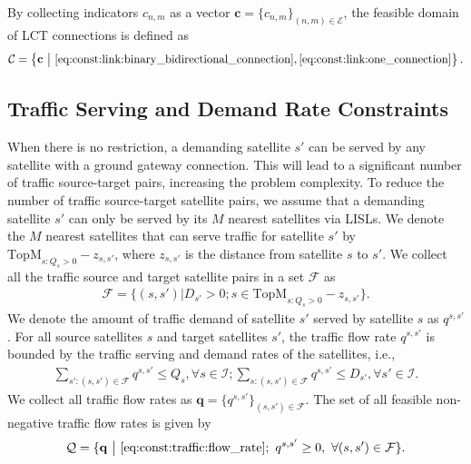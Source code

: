 \documentclass[journal]{IEEEtran}
\begin{document}
By collecting indicators $c_{n,m}$ as a vector  $\mathbf{c} = \{c_{n,m}\}_{(n,m)\in\mathcal{E}}$, the feasible domain of LCT connections is defined as
\begin{equation}
  \begin{aligned}
    \mathcal{C} = \left\{ \mathbf{c} \ \big|\   \eqref{eq:const:link:binary_bidirectional_connection},\eqref{eq:const:link:one_connection}\right\}.
  \end{aligned}
\end{equation}


\subsection{Traffic Serving and Demand Rate Constraints}
When there is no restriction, a demanding satellite $s'$ can be served by any satellite with a ground gateway connection. This will lead to a significant number of traffic source-target pairs, increasing the problem complexity.
To reduce the number of traffic source-target satellite pairs, we assume that a demanding satellite $s'$ can only be served by its $M$ nearest satellites via LISLs.
We denote the $M$ nearest satellites that can serve traffic for satellite $s'$ by $\mathrm{TopM}_{s:Q_s > 0} -z_{s,s'}$, where $z_{s,s'}$ is the distance from satellite $s$ to $s'$.
We collect all the traffic source and target satellite pairs in a set $\mathcal{F}$ as
\begin{equation}
  \begin{aligned}
    \mathcal{F} = \{(s,s')\big|D_{s'} > 0; s \in \mathrm{TopM}_{s:Q_s > 0} -z_{s,s'} \}.
  \end{aligned}
\end{equation}
We denote the amount of traffic demand of satellite $s'$ served by satellite $s$ as $q^{s,s'}$.
For all source satellites $s$ and target satellites $s'$, the traffic flow rate $q^{s,s'}$ is bounded by the traffic serving and demand rates of the satellites, i.e.,
\begin{equation}\label{eq:const:traffic:flow_rate}
  \begin{aligned}
    \sum_{s':(s,s')\in\mathcal{F}}  q^{s,s'} \leq Q_s,\forall s\in\mathcal{I};\sum_{s:(s,s')\in\mathcal{F}}  q^{s,s'} \leq D_{s'}, \forall s'\in\mathcal{I}.
  \end{aligned}
\end{equation}
We collect all traffic flow rates as $\mathbf{q} = \{q^{s,s'}\}_{(s,s')\in\mathcal{F}}$. The set of all feasible non-negative traffic flow rates is given by
\begin{equation}
  \begin{aligned}
    \mathcal{Q} = \{\mathbf{q} \ \big |\  \eqref{eq:const:traffic:flow_rate};\ q^{s,s'} \geq 0,\ \forall (s,s')\in\mathcal{F}\}.
  \end{aligned}
\end{equation}
\end{document}
